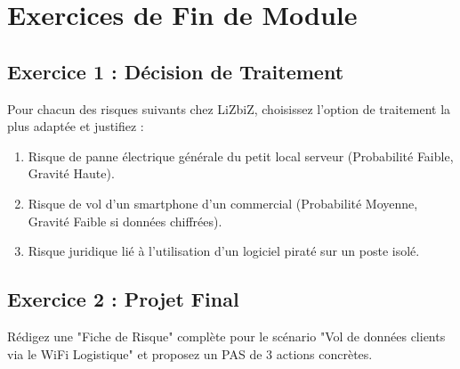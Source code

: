 \section{Exercices de Fin de Module}

\subsection{Exercice 1 : Décision de Traitement}

Pour chacun des risques suivants chez LiZbiZ, choisissez l'option de traitement la plus adaptée et justifiez :
\begin{enumerate}
    \item Risque de panne électrique générale du petit local serveur (Probabilité Faible, Gravité Haute).
    \item Risque de vol d'un smartphone d'un commercial (Probabilité Moyenne, Gravité Faible si données chiffrées).
    \item Risque juridique lié à l'utilisation d'un logiciel piraté sur un poste isolé.
\end{enumerate}

\subsection{Exercice 2 : Projet Final}

Rédigez une "Fiche de Risque" complète pour le scénario "Vol de données clients via le WiFi Logistique" et proposez un PAS de 3 actions concrètes.
